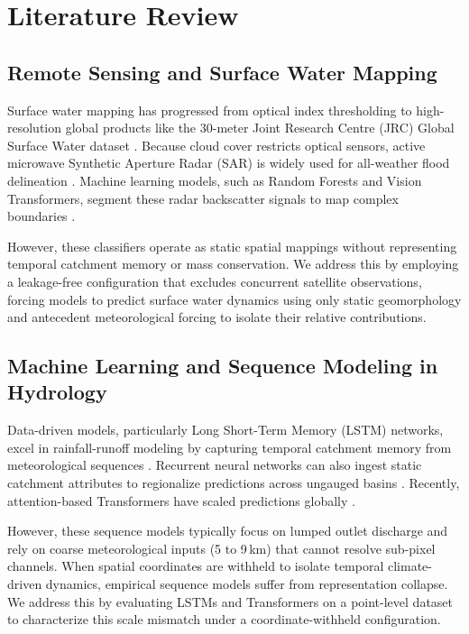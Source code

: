 \section{Literature Review}

\subsection{Remote Sensing and Surface Water Mapping}
Surface water mapping has progressed from optical index thresholding \citep{Amani2020Google} to high-resolution global products like the 30-meter Joint Research Centre (JRC) Global Surface Water dataset \citep{Pekel2016Highresolution, Liu2021FinerResolution, Yang202130}. Because cloud cover restricts optical sensors, active microwave Synthetic Aperture Radar (SAR) is widely used for all-weather flood delineation \citep{Twele2016Sentinel1}. Machine learning models, such as Random Forests and Vision Transformers, segment these radar backscatter signals to map complex boundaries \citep{Phan2020Land, Bazi2021Vision}.

However, these classifiers operate as static spatial mappings without representing temporal catchment memory or mass conservation. We address this by employing a leakage-free configuration that excludes concurrent satellite observations, forcing models to predict surface water dynamics using only static geomorphology and antecedent meteorological forcing to isolate their relative contributions.

\subsection{Machine Learning and Sequence Modeling in Hydrology}
Data-driven models, particularly Long Short-Term Memory (LSTM) networks, excel in rainfall-runoff modeling by capturing temporal catchment memory from meteorological sequences \citep{Kratzert2018, Sit2020A, Wünsch2021Groundwater}. Recurrent neural networks can also ingest static catchment attributes to regionalize predictions across ungauged basins \citep{Kratzert2019}. Recently, attention-based Transformers have scaled predictions globally \citep{Nearing2024Global, Feng2023The}.

However, these sequence models typically focus on lumped outlet discharge and rely on coarse meteorological inputs (5 to 9\,km) that cannot resolve sub-pixel channels. When spatial coordinates are withheld to isolate temporal climate-driven dynamics, empirical sequence models suffer from representation collapse. We address this by evaluating LSTMs and Transformers on a point-level dataset to characterize this scale mismatch under a coordinate-withheld configuration.

